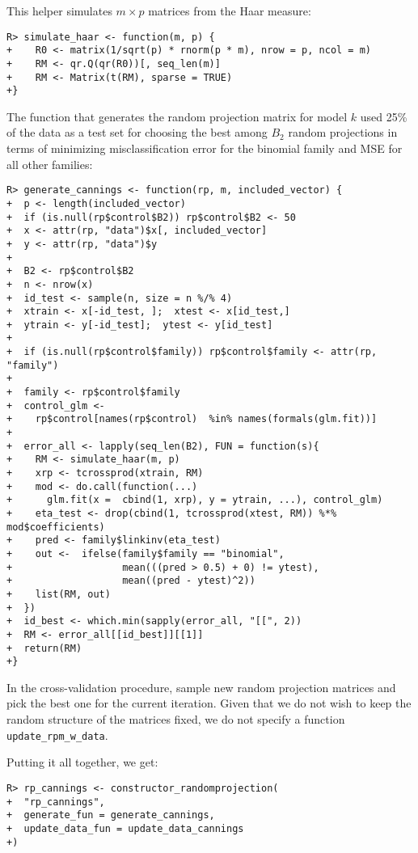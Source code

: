 \documentclass[
  article]{jss}
\begin{document}
This helper simulates \(m\times p\) matrices from the Haar measure:

\begin{verbatim}
R> simulate_haar <- function(m, p) {
+    R0 <- matrix(1/sqrt(p) * rnorm(p * m), nrow = p, ncol = m)
+    RM <- qr.Q(qr(R0))[, seq_len(m)]
+    RM <- Matrix(t(RM), sparse = TRUE)  
+}
\end{verbatim}

The function that generates the random projection matrix for model \(k\)
used 25\% of the data as a test set for choosing the best among \(B_2\)
random projections in terms of minimizing misclassification error for
the binomial family and MSE for all other families:

\begin{verbatim}
R> generate_cannings <- function(rp, m, included_vector) {
+  p <- length(included_vector)
+  if (is.null(rp$control$B2)) rp$control$B2 <- 50
+  x <- attr(rp, "data")$x[, included_vector]
+  y <- attr(rp, "data")$y
+  
+  B2 <- rp$control$B2
+  n <- nrow(x)
+  id_test <- sample(n, size = n %/% 4)
+  xtrain <- x[-id_test, ];  xtest <- x[id_test,]
+  ytrain <- y[-id_test];  ytest <- y[id_test]
+  
+  if (is.null(rp$control$family)) rp$control$family <- attr(rp, "family")
+  
+  family <- rp$control$family
+  control_glm <-
+    rp$control[names(rp$control)  %in% names(formals(glm.fit))]
+
+  error_all <- lapply(seq_len(B2), FUN = function(s){
+    RM <- simulate_haar(m, p)
+    xrp <- tcrossprod(xtrain, RM)
+    mod <- do.call(function(...) 
+      glm.fit(x =  cbind(1, xrp), y = ytrain, ...), control_glm)
+    eta_test <- drop(cbind(1, tcrossprod(xtest, RM)) %*% mod$coefficients)
+    pred <- family$linkinv(eta_test)
+    out <-  ifelse(family$family == "binomial",
+                   mean(((pred > 0.5) + 0) != ytest), 
+                   mean((pred - ytest)^2))
+    list(RM, out)
+  })
+  id_best <- which.min(sapply(error_all, "[[", 2))
+  RM <- error_all[[id_best]][[1]]
+  return(RM)
+}
\end{verbatim}

In the cross-validation procedure, sample new random projection matrices
and pick the best one for the current iteration. Given that we do not
wish to keep the random structure of the matrices fixed, we do not
specify a function \texttt{update\_rpm\_w\_data}.

Putting it all together, we get:

\begin{verbatim}
R> rp_cannings <- constructor_randomprojection(
+  "rp_cannings",
+  generate_fun = generate_cannings,
+  update_data_fun = update_data_cannings
+)
\end{verbatim}
\end{document}
